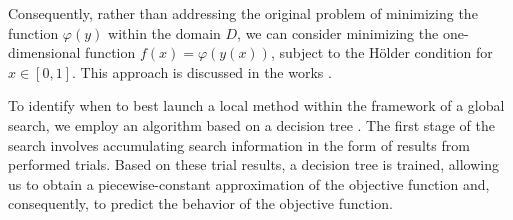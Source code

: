 \documentclass[runningheads]{llncs}
\begin{document}
Consequently, rather than addressing the original problem of minimizing the function $\varphi(y)$ within the domain $D$, we can consider minimizing the one-dimensional function $f(x)=\varphi(y(x))$, subject to the Hölder condition for $x \in [0, 1]$.
This approach is discussed in the works \cite{Sergeyev2022, Usova2024}.


To identify when to best launch a local method  within the framework of a global search, we employ an algorithm based on a decision tree  \cite{Barkalov2023_2}. The first stage of the search involves accumulating search information in the form of results from performed trials. Based on these trial results, a decision tree is trained, allowing us to obtain a piecewise-constant approximation of the objective function and, consequently, to predict the behavior of the objective function.

\end{document}
